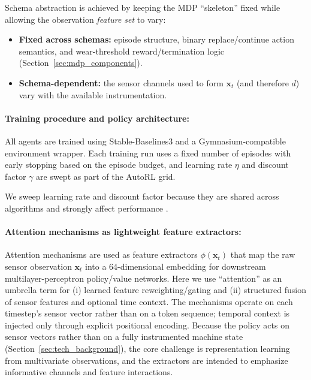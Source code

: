 \documentclass[sn-vancouver-num]{sn-jnl}%
\begin{document}
Schema abstraction is achieved by keeping the MDP ``skeleton'' fixed while allowing the observation \emph{feature set} to vary:
\begin{itemize}
	\item \textbf{Fixed across schemas:} episode structure, binary replace/continue action semantics, and wear-threshold reward/termination logic (Section~\ref{sec:mdp_components}).
	\item \textbf{Schema-dependent:} the sensor channels used to form $\mathbf{x}_t$ (and therefore $d$) vary with the available instrumentation.
\end{itemize}

\paragraph{Training procedure and policy architecture:}
All agents are trained using Stable-Baselines3 and a Gymnasium-compatible environment wrapper. Each training run uses a fixed number of episodes with early stopping based on the episode budget, and learning rate $\eta$ and discount factor $\gamma$ are swept as part of the AutoRL grid.

We sweep learning rate and discount factor because they are shared across algorithms and strongly affect performance \cite{Henderson2019, Shala2022AutoRL, Eimer2023}.
  
\paragraph{Attention mechanisms as lightweight feature extractors:}
\label{sec:attention}

Attention mechanisms are used as feature extractors $\phi(\mathbf{x}_t)$ that map the raw sensor observation $\mathbf{x}_t$ into a 64-dimensional embedding for downstream multilayer-perceptron policy/value networks. Here we use ``attention'' as an umbrella term for (i) learned feature reweighting/gating and (ii) structured fusion of sensor features and optional time context. The mechanisms operate on each timestep's sensor vector rather than on a token sequence; temporal context is injected only through explicit positional encoding. Because the policy acts on sensor vectors rather than on a fully instrumented machine state (Section~\ref{sec:tech_background}), the core challenge is representation learning from multivariate observations, and the extractors are intended to emphasize informative channels and feature interactions.
\end{document}
